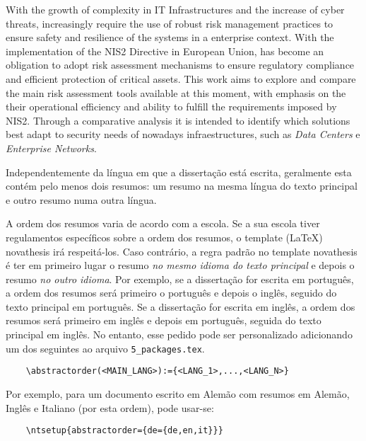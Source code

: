 
%

With the growth of complexity in IT Infrastructures and the increase of cyber threats, increasingly require the use of robust risk management practices
 to ensure safety and resilience of the systems in a enterprise context. With the implementation of the NIS2 Directive in European Union, has become
 an obligation to adopt risk assessment mechanisms to ensure regulatory compliance and efficient protection of critical assets. This work aims to explore
 and compare the main risk assessment tools available at this moment, with emphasis on the their operational efficiency and ability to fulfill the requirements imposed by NIS2.
Through a comparative analysis it is intended to identify which solutions best adapt to security needs of nowadays infraestructures,
 such as \textit{Data Centers} e \textit{Enterprise Networks}.

Independentemente da língua em que a dissertação está escrita, geralmente esta contém pelo menos dois resumos: um resumo na mesma língua do texto principal e outro resumo numa outra língua.

A ordem dos resumos varia de acordo com a escola. Se a sua escola tiver regulamentos específicos sobre a ordem dos resumos, o template (\LaTeX) \gls{novathesis} irá respeitá-los. Caso contrário, a regra padrão no template \gls{novathesis} é ter em primeiro lugar o resumo \emph{no mesmo idioma do texto principal} e depois o resumo \emph{no outro idioma}. Por exemplo, se a dissertação for escrita em português, a ordem dos resumos será primeiro o português e depois o inglês, seguido do texto principal em português. Se a dissertação for escrita em inglês, a ordem dos resumos será primeiro em inglês e depois em português, seguida do texto principal em inglês.
%
No entanto, esse pedido pode ser personalizado adicionando um dos seguintes ao arquivo \verb+5_packages.tex+.

\begin{verbatim}
    \abstractorder(<MAIN_LANG>):={<LANG_1>,...,<LANG_N>}
\end{verbatim}

Por exemplo, para um documento escrito em Alemão com resumos em Alemão, Inglês e Italiano (por esta ordem), pode usar-se:
\begin{verbatim}
    \ntsetup{abstractorder={de={de,en,it}}}
\end{verbatim}

